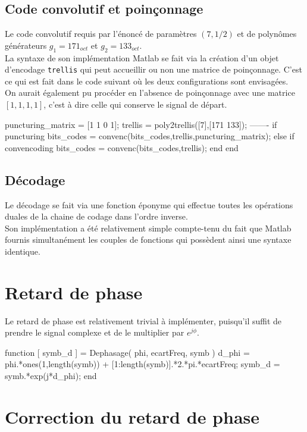 \documentclass[a4paper,11pt]{article}
\begin{document}
\subsection{Code convolutif et poinçonnage}
Le code convolutif requis par l'énoncé de paramètres $(7,1/2)$ et de polynômes générateurs $g_1=171_{oct}$ et  $g_2=133_{oct}$. \\
La syntaxe de son implémentation Matlab se fait via la création d'un objet d'encodage \texttt{trellis} qui peut accueillir ou non une matrice de poinçonnage. C'est ce qui est fait dans le code suivant où les deux configurations sont envisagées. \\
On aurait également pu procéder en l'absence de poinçonnage avec une matrice $[1,1,1,1]$, c'est à dire celle qui conserve le signal de départ.

\begin{lstun}
puncturing_matrix = [1 1 0 1];
trellis = poly2trellis([7],[171 133]);
-------
if puncturing
	bits_codes = convenc(bits_codes,trellis,puncturing_matrix);
else
if convencoding
	bits_codes = convenc(bits_codes,trellis);
end
end
\end{lstun}

\subsection{Décodage}
Le décodage se fait via une fonction éponyme qui effectue toutes les opérations duales de la chaine de codage dans l'ordre inverse. \\
Son implémentation a été relativement simple compte-tenu du fait que Matlab fournis simultanément les couples de fonctions qui possèdent ainsi une syntaxe identique.

\section{Retard de phase}
Le retard de phase est relativement trivial à implémenter, puisqu'il suffit de prendre le signal complexe et de le multiplier par $e^{j \phi}$. 

\begin{lstun}
	function [ symb_d ] = Dephasage( phi, ecartFreq, symb )
	d_phi = phi.*ones(1,length(symb)) + [1:length(symb)].*2.*pi.*ecartFreq;
	symb_d = symb.*exp(j*d_phi);
	end
\end{lstun}

\section{Correction du retard de phase}
\end{document}
